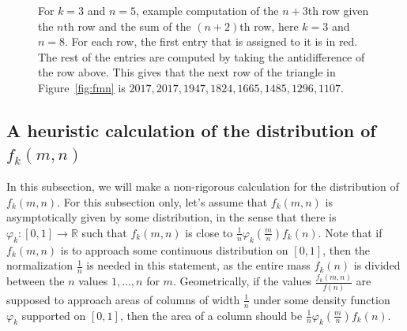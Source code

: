 \documentclass{amsart}
\theoremstyle{definition}
\begin{document}
\begin{figure}
    \centering
    \caption{For $k=3$ and $n=5$, example computation of the $n+3$th row given the $n$th row and the sum of the $(n+2)$th row, here $k=3$ and $n=8$. For each row, the first entry that is assigned to it is in red. The rest of the entries are computed by taking the antidifference of the row above. This gives that the next row of the triangle in Figure~\ref{fig:fmn} is $2017,2017,1947,1824,1665,1485,1296,1107$.}
    \label{fig:comp}
\end{figure}

\subsection{A heuristic calculation of the distribution of $f_k(m,n)$}\label{subsec:heuristic}
In this subsection, we will make a non-rigorous calculation for the distribution of $f_k(m,n)$. For this subsection only, let's assume that $f_k(m,n)$ is asymptotically given by some distribution, in the sense that there is $\varphi_k\colon [0,1]\to \mathbb{R}$ such that $f_k(m,n)$ is close to $\frac{1}{n}\varphi_k\left(\frac{m}{n}\right) f_k(n)$. Note that if $f_k(m,n)$ is to approach some continuous distribution on $[0,1]$, then the normalization $\frac{1}{n}$ is needed in this statement, as the entire mass $f_k(n)$ is divided between the $n$ values $1,\ldots, n$ for $m$. Geometrically, if the values $\frac{f_k(m,n)}{f(n)}$ are supposed to approach areas of columns of width $\frac{1}{n}$ under some density function $\varphi_k$ supported on $[0,1]$, then the area of a column should be $\frac{1}{n}\varphi_k\left(\frac{m}{n}\right)f_k(n)$. 
\end{document}
